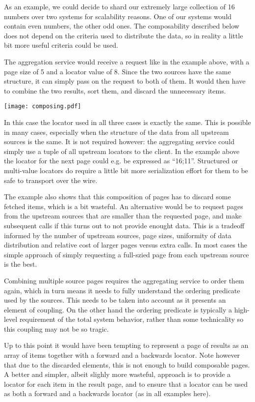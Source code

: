 \documentclass[11pt,a4paper]{article}
\begin{document}
\begin{multicols}{2}
As an example, we could decide to shard our extremely large collection of 16
numbers over two systems for scalability reasons. One of our systems would
contain even numbers, the other odd ones. The composability described
below does not depend on the criteria used to distribute the data, so in reality
a little bit more useful criteria could be used.

The aggregation service would receive a request like in the example above, with
a page size of 5 and a locator value of 8. Since the two sources have the same
structure, it can simply pass on the request to both of them. It would then have
to combine the two results, sort them, and discard the unnecessary items. 

\texttt{[image: composing.pdf]}

In this case the locator used in all three cases is exactly the same. This is
possible in many cases, especially when the structure of the data from all
upstream sources is the same. It is not required however: the aggregating
service could simply use a tuple of all upstream locators to the client. In the
example above the locator for the next page could e.g. be expressed as
``16;11''. Structured or multi-value locators do require a little bit more
serialization effort for them to be safe to transport over the wire.

The example also shows that this composition of pages has to discard some
fetched items, which is a bit wasteful. An alternative would be to request
pages from the upstream sources that are smaller than the requested page, and
make subsequent calls if this turns out to not provide enought data. This is a
tradeoff informed by the number of upstream sources, page sizes, uniformity of
data distribution and relative cost of larger pages versus extra calls. In most
cases the simple approach of simply requesting a full-szied page from each
upstream source is the best.

Combining multiple source pages requires the aggregating service to order them
again, which in turn means it needs to fully understand the ordering predicate
used by the sources. This needs to be taken into account as it presents an
element of coupling. On the other hand the ordering predicate is typically a
high-level requirement of the total system behavior, rather than some
technicality so this coupling may not be so tragic.

Up to this point it would have been tempting to represent a page of results as
an array of items together with a forward and a backwards locator. Note however
that due to the discarded elements, this is not enough to build composable
pages. A better and simpler, albeit slighly more wasteful, approach is to
provide a locator for each item in the result page, and to ensure that a locator
can be used as both a forward and a backwards locator (as in all examples
here).





\end{multicols}
\end{document}
